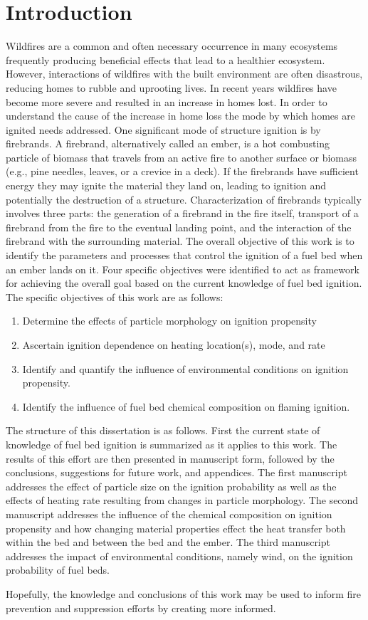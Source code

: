 
\chapter{Introduction}
\label{part:intro}

\blindtext

   Wildfires are a common and often necessary occurrence in many ecosystems frequently producing beneficial effects that lead to a healthier ecosystem. However, interactions of wildfires with the built environment are often disastrous, reducing homes to rubble and uprooting lives. In recent years wildfires have become more severe and resulted in an increase in homes lost. In order to understand the cause of the increase in home loss the mode by which homes are ignited needs addressed. One significant mode of structure ignition is by firebrands. A firebrand, alternatively called an ember, is a hot combusting particle of biomass that travels from an active fire to another surface or biomass (e.g., pine needles, leaves, or a crevice in a deck). If the firebrands have sufficient energy they  may ignite the material they land on, leading to ignition and potentially the destruction of a structure. Characterization of firebrands typically involves three parts: the generation of a firebrand in the fire itself, transport of a firebrand from the fire to the eventual landing point, and the interaction of the firebrand with the surrounding material. The overall objective of this work is to identify the parameters and processes that control the ignition of a fuel bed when an ember lands on it. Four specific objectives were identified to act as framework for achieving the overall goal based on the current knowledge of fuel bed ignition. The specific objectives of this work are as follows:
        \begin{enumerate}
            \item Determine the effects of particle morphology on ignition propensity
            \item Ascertain ignition dependence on heating location(s), mode, and rate
            \item Identify and quantify the influence of environmental conditions on ignition propensity.
            \item Identify the influence of fuel bed chemical composition on flaming ignition.
        \end{enumerate}
    The structure of this dissertation is as follows. First the current state of knowledge of fuel bed ignition is summarized as it applies to this work. The results of this effort are then presented in manuscript form, followed by the conclusions, suggestions for future work, and appendices. 
    The first manuscript addresses the effect of particle size on the ignition probability as well as the effects of heating rate resulting from changes in particle morphology. The second manuscript addresses the influence of the chemical composition on ignition propensity and how changing material properties effect the heat transfer both within the bed and between the bed and the ember. The third manuscript addresses the impact of environmental conditions, namely wind, on the ignition probability of fuel beds.
    
    Hopefully, the knowledge and conclusions of this work may be used to inform fire prevention and suppression efforts by creating more informed.